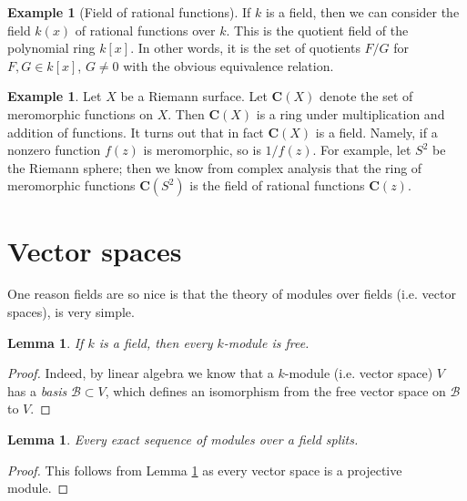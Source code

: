 \documentclass{stacks-project}
\theoremstyle{plain}
\newtheorem{lemma}[subsection]{Lemma}
\theoremstyle{definition}
\newtheorem{example}[subsection]{Example}
\theoremstyle{remark}
\numberwithin{equation}{subsection}
\begin{document}
\begin{example}[Field of rational functions]
\label{example-field-of-rational-functions}
If $k$ is a field, then we can consider the field $k(x)$ of rational
functions over $k$. This is the quotient field of the polynomial ring
$k[x]$. In other words, it is the set of quotients $F/G$ for
$F, G \in k[x]$, $G \not = 0$ with the obvious equivalence relation.
\end{example}

\begin{example}
\label{example-field-of-meromorphic-functions}
Let $X$ be a Riemann surface. Let $\mathbf{C}(X)$ denote the
set of meromorphic functions on $X$. Then $\mathbf{C}(X)$ is a ring under
multiplication and addition of functions. It turns out that in fact
$\mathbf{C}(X)$ is a field. Namely, if a nonzero function $f(z)$ is
meromorphic, so is $1/f(z)$. For example, let $S^2$ be the Riemann
sphere; then we know from complex analysis that the ring of meromorphic
functions $\mathbf{C}(S^2)$ is the field of rational functions $\mathbf{C}(z)$.
\end{example}



\section{Vector spaces}
\label{section-vector-spaces}

\noindent
One reason fields are so nice is that the theory of modules over fields
(i.e. vector spaces), is very simple.

\begin{lemma}
\label{lemma-vector-space-is-free}
If $k$ is a field, then every $k$-module is free.
\end{lemma}

\begin{proof}
Indeed, by linear algebra we know that a $k$-module (i.e. vector space)
$V$ has a {\it basis} $\mathcal{B} \subset V$, which defines an isomorphism
from the free vector space on $\mathcal{B}$ to $V$.
\end{proof}

\begin{lemma}
\label{lemma-field-semi-simple}
Every exact sequence of modules over a field splits.
\end{lemma}

\begin{proof}
This follows from Lemma \ref{lemma-vector-space-is-free} as every vector
space is a projective module.
\end{proof}
\end{document}
